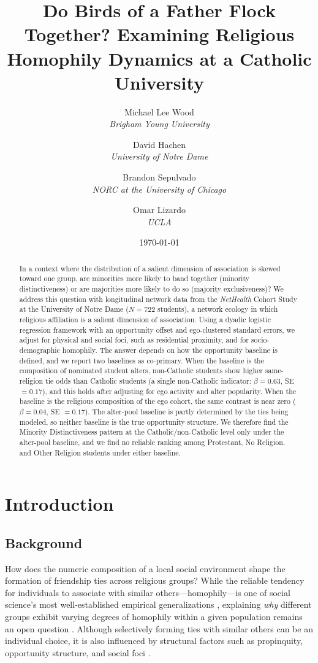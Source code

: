 \documentclass[11pt]{article}
\title{Do Birds of a Father Flock Together? Examining Religious Homophily Dynamics at a Catholic University}
\author{
  Michael Lee Wood \\ \textit{Brigham Young University} \and
  David Hachen \\ \textit{University of Notre Dame} \and
  Brandon Sepulvado \\ \textit{NORC at the University of Chicago} \and
  Omar Lizardo \\ \textit{UCLA}
}
\date{\today}
\begin{document}
\maketitle
\newpage
\begin{abstract}
In a context where the distribution of a salient dimension of association is skewed toward one group, are minorities more likely to band together (minority distinctiveness) or are majorities more likely to do so (majority exclusiveness)? We address this question with longitudinal network data from the \textit{NetHealth} Cohort Study at the University of Notre Dame ($N = 722$ students), a network ecology in which religious affiliation is a salient dimension of association. Using a dyadic logistic regression framework with an opportunity offset and ego-clustered standard errors, we adjust for physical and social foci, such as residential proximity, and for socio-demographic homophily. The answer depends on how the opportunity baseline is defined, and we report two baselines as co-primary. When the baseline is the composition of nominated student alters, non-Catholic students show higher same-religion tie odds than Catholic students (a single non-Catholic indicator: $\beta = 0.63$, SE $= 0.17$), and this holds after adjusting for ego activity and alter popularity. When the baseline is the religious composition of the ego cohort, the same contrast is near zero ($\beta = 0.04$, SE $= 0.17$). The alter-pool baseline is partly determined by the ties being modeled, so neither baseline is the true opportunity structure. We therefore find the Minority Distinctiveness pattern at the Catholic/non-Catholic level only under the alter-pool baseline, and we find no reliable ranking among Protestant, No Religion, and Other Religion students under either baseline.
\end{abstract}
\newpage
\section{Introduction}
\subsection{Background}
How does the numeric composition of a local social environment shape the formation of friendship ties across religious groups? While the reliable tendency for individuals to associate with similar others---homophily---is one of social science's most well-established empirical generalizations \citep{mcpherson2001}, explaining \textit{why} different groups exhibit varying degrees of homophily within a given population remains an open question \citep{mcfarland2014network-735}. Although selectively forming ties with similar others can be an individual choice, it is also influenced by structural factors such as propinquity, opportunity structure, and social foci \citep{rivera2010dynamics-e3e, feld2009}. 
\end{document}
